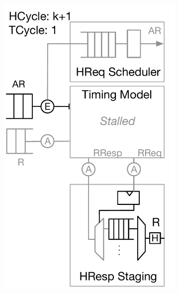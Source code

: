 \begin{figure}
\begin{subfigure}[t]{0.24\textwidth}
        \includegraphics[width=\columnwidth]{figures/model-operation-3.pdf}
        \caption{}
        \label{fig:model-operation-3}
    \end{subfigure}
    \begin{subfigure}[t]{0.23\textwidth}

\end{subfigure}
\end{figure}
